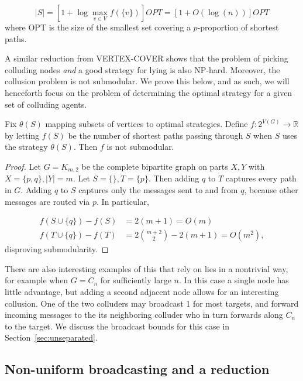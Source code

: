 \documentclass{comnet}
\begin{document}
$$ |S| = \left [ 1 + \log \max_{v \in V} f(\{ v \}) \right ] OPT
       = \left [ 1 + O(\log(n)) \right ] OPT$$
where OPT is the size of the smallest set covering a $p$-proportion of shortest
paths. 

A similar reduction from VERTEX-COVER shows that the problem of picking
colluding nodes \emph{and} a good strategy for lying is also NP-hard. Moreover,
the collusion problem is not submodular. We prove this below, and as such, we
will henceforth focus on the problem of determining the optimal strategy for a
given set of colluding agents.

\begin{proposition} \label{prop:not-submodular}

Fix $\theta(S)$ mapping subsets of vertices to optimal strategies. Define $f:
2^{V(G)} \to \mathbb{R}$ by letting $f(S)$ be the number of shortest paths
passing through $S$ when $S$ uses the strategy $\theta(S)$. Then $f$ is not
submodular.

\end{proposition}

\begin{proof}

Let $G = K_{m,2}$ be the complete bipartite graph on parts $X,Y$ with $X = \{
p,q \}, |Y|=m$. Let $S = \{ \}, T = \{ p \}$. Then adding $q$ to $T$ captures
every path in $G$. Adding $q$ to $S$ captures only the messages sent to and
from $q$, because other messages are routed via $p$. In particular,

\begin{align*}
   f(S \cup \{ q \}) - f(S) &= 2(m+1) = O(m) \\ 
   f(T \cup \{ q \}) - f(T) &= 2 \binom{m+2}{2} - 2(m+1) = O(m^2),
\end{align*}
disproving submodularity. 
\end{proof}

There are also interesting examples of this that rely on lies in a nontrivial
way, for example when $G = C_n$ for sufficiently large $n$. In this case a
single node has little advantage, but adding a second adjacent node allows for
an interesting collusion. One of the two colluders may broadcast 1 for most
targets, and forward incoming messages to the its neighboring colluder who in
turn forwards along $C_n$ to the target. We discuss the broadcast bounds for
this case in Section~\ref{sec:unseparated}.

\subsection{Non-uniform broadcasting and a reduction} \label{sec:reduction}
\end{document}
